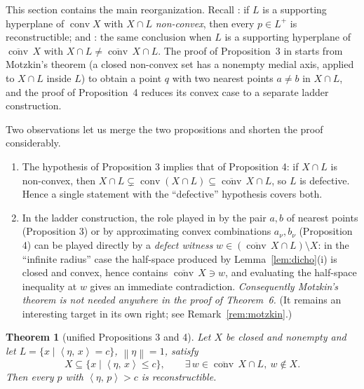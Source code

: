 \documentclass[11pt]{article}
\newtheorem{theorem}{Theorem}[section]
\theoremstyle{remark}
\newcommand{\X}{X}
\newcommand{\conv}{\operatorname{conv}}
\newcommand{\cconv}[1]{\overline{\conv}\,#1}
\newcommand{\sca}[2]{\left\langle #1,\, #2\right\rangle}
\newcommand{\norm}[1]{\left\lVert #1\right\rVert}
\begin{document}
This section contains the main reorganization. Recall \cite[Proposition~3]{Bia}: if $L$ is a
supporting hyperplane of $\conv \X$ with $\X\cap L$ \emph{non-convex}, then every $p\in L^{+}$
is reconstructible; and \cite[Proposition~4]{Bia}: the same conclusion when $L$ is a supporting
hyperplane of $\cconv \X$ with $\X\cap L\neq\cconv \X\cap L$. The proof of Proposition~3 in
\cite{Bia} starts from Motzkin's theorem (a closed non-convex set has a nonempty medial axis,
applied to $\X\cap L$ inside $L$) to obtain a point $q$ with two nearest points $a\neq b$ in
$\X\cap L$, and the proof of Proposition~4 reduces its convex case to a separate ladder
construction.

Two observations let us merge the two propositions and shorten the proof considerably.

\begin{enumerate}[label=(\Alph*),itemsep=2pt]
\item The hypothesis of Proposition 3 implies that of Proposition 4: if $\X\cap L$ is
non-convex, then $\X\cap L\subsetneq\conv(\X\cap L)\subseteq\cconv\X\cap L$, so $L$ is
defective. Hence a single statement with the ``defective'' hypothesis covers both.
\item In the ladder construction, the role played in \cite{Bia} by the pair $a,b$ of nearest
points (Proposition 3) or by approximating convex combinations $a_\nu,b_\nu$ (Proposition 4) can
be played directly by a \emph{defect witness} $w\in(\cconv\X\cap L)\setminus \X$: in the
``infinite radius'' case the half-space produced by Lemma~\ref{lem:dicho}(i) is closed and
convex, hence contains $\cconv \X\ni w$, and evaluating the half-space inequality at $w$ gives an
immediate contradiction. \emph{Consequently Motzkin's theorem is not needed anywhere in the proof
of Theorem~6.} (It remains an interesting target in its own right; see
Remark~\ref{rem:motzkin}.)
\end{enumerate}

\begin{theorem}[unified Propositions 3 and 4]\label{thm:unified}
Let $\X$ be closed and nonempty and let $L=\{x\mid\sca{\eta}{x}=c\}$, $\norm{\eta}=1$, satisfy
\[
\X\subseteq\{x\mid \sca{\eta}{x}\le c\},\qquad
\exists\, w\in \cconv\X\cap L,\ w\notin \X .
\]
Then every $p$ with $\sca{\eta}{p}>c$ is reconstructible.
\end{theorem}
\end{document}
